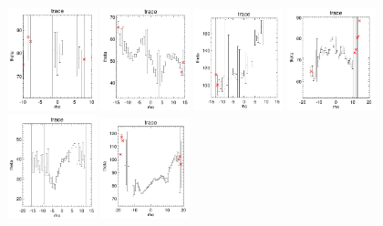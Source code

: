 \documentclass[fleqn,usenatbib]{mnras}
\begin{document}
\begin{figure}
    \centering
    \includegraphics[width=0.23\textwidth]{Images/trace-plots/trace-plots-cpsbs/7964-1902.png}
    \includegraphics[width=0.23\textwidth]{Images/trace-plots/trace-plots-cpsbs/8080-3702.png}
    \includegraphics[width=0.23\textwidth]{Images/trace-plots/trace-plots-cpsbs/8081-3702.png}
    \includegraphics[width=0.23\textwidth]{Images/trace-plots/trace-plots-cpsbs/8082-3704.png}
    \includegraphics[width=0.23\textwidth]{Images/trace-plots/trace-plots-cpsbs/8143-3703.png}
    \includegraphics[width=0.23\textwidth]{Images/trace-plots/trace-plots-cpsbs/8313-6101.png}

\end{figure}
\end{document}
